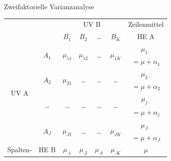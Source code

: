 \documentclass{beamer}
\begin{document}
		\begin{frame}{Zweifaktorielle Varianzanalyse}
			
			\begin{table}[]
				\centering
				\resizebox{\textwidth}{!} {
				\begin{tabular}{|cc|c|c|c|c|c|}
					\hline
					\multicolumn{2}{|c|}{\multirow{2}{*}{}}        & \multicolumn{4}{c|}{UV B}                                                                                        & Zeilenmittel           \\
					\multicolumn{2}{|c|}{}                         & $B_1$                       & $B_2$                       & \dots                  & $B_K$                       & HE A                   \\ \hline
					\multirow{8}{*}{UV A} & \multirow{2}{*}{$A_1$} & \multirow{2}{*}{$\mu_{11}$} & \multirow{2}{*}{$\mu_{12}$} & \multirow{2}{*}{\dots} & \multirow{2}{*}{$\mu_{1K}$} & $\mu_{1\cdot}$         \\
					&                        &                             &                             &                        &                             & $= \mu + \alpha_1$     \\ \cline{2-7} 
					& \multirow{2}{*}{$A_2$} & \multirow{2}{*}{$\mu_{21}$} & \multirow{2}{*}{\dots}      & \multirow{2}{*}{\dots} & \multirow{2}{*}{\dots}      & $\mu_{2\cdot}$         \\
					&                        &                             &                             &                        &                             & $= \mu + \alpha_2$     \\ \cline{2-7} 
					& \multirow{2}{*}{\dots} & \multirow{2}{*}{\dots}      & \multirow{2}{*}{\dots}      & \multirow{2}{*}{\dots} & \multirow{2}{*}{\dots}      & $\mu_{j\cdot}$         \\
					&                        &                             &                             &                        &                             & $= \mu + \alpha_j$     \\ \cline{2-7} 
					& \multirow{2}{*}{$A_J$} & \multirow{2}{*}{$\mu_{J1}$} & \multirow{2}{*}{\dots}      & \multirow{2}{*}{\dots} & \multirow{2}{*}{$\mu_{JK}$} & $\mu_{J\cdot}$         \\
					&                        &                             &                             &                        &                             & $= \mu + \alpha_J$     \\ \hline
					Spalten-              & \multirow{2}{*}{HE B}  & $\mu_{\cdot1}$              & $\mu_{\cdot2}$              & $\mu_{\cdot k}$        & $\mu_{\cdot K}$             & \multirow{2}{*}{$\mu$} \\

\end{tabular}}
\end{table}
\end{frame}
\end{document}
